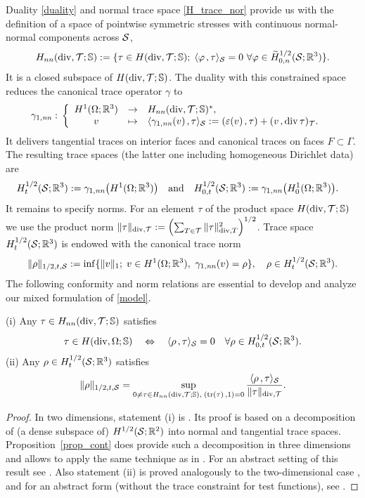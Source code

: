 \documentclass[11pt]{article}
\begin{document}
Duality \eqref{duality} and normal trace space \eqref{H_trace_nor} provide us
with the definition of a space of pointwise symmetric stresses with continuous normal-normal
components across $\mathcal{S}$,
\[
   H_{nn}(\operatorname{div},\mathcal{T};\mathbb{S}) :=
   \{\tau\in H(\operatorname{div},\mathcal{T};\mathbb{S});\;
     \langle{}\varphi\hspace*{.5mm},\tau\rangle_{\mathcal{S}}=0\ \forall \varphi\in \widetilde H^{1/2}_{0,n}(\mathcal{S};\mathbb{R}^3)\}.
\]
It is a closed subspace of $H(\operatorname{div},\mathcal{T};\mathbb{S})$.
The duality with this constrained space reduces the canonical trace operator $\gamma$ to
\begin{align*}
   {\gamma_{1,\mathit{nn}}}:\;&\left\{\begin{array}{cll}
               H^1(\Omega;\mathbb{R}^3) &\rightarrow& H_{nn}(\operatorname{div},\mathcal{T};\mathbb{S})^*,\\
               v &\mapsto& \langle{}{\gamma_{1,\mathit{nn}}}(v)\hspace*{.5mm},\tau\rangle_{\mathcal{S}}
               := (\varepsilon(v)\hspace*{.5mm},\tau) + (v\hspace*{.5mm},\operatorname{div}\tau)_{\mathcal{T}}.
            \end{array}\right.
\end{align*}
It delivers tangential traces on interior faces and canonical traces on faces $F\subset\Gamma$.
The resulting trace spaces (the latter one including homogeneous Dirichlet data) are
\begin{align*}
   H^{1/2}_t(\mathcal{S};\mathbb{R}^3) &:= {\gamma_{1,\mathit{nn}}}\bigl(H^1(\Omega;\mathbb{R}^3)\bigr)\quad\text{and}\quad
   H^{1/2}_{0,t}(\mathcal{S};\mathbb{R}^3) := {\gamma_{1,\mathit{nn}}}\bigl(H^1_0(\Omega;\mathbb{R}^3)\bigr).
\end{align*}
It remains to specify norms.
For an element $\tau$ of the product space $H(\operatorname{div},\mathcal{T};\mathbb{S})$ we use the product norm
$\|\tau\|_{\operatorname{div},\mathcal{T}}:=\Bigl(\sum_{T\in\mathcal{T}}\|\tau\|_{\operatorname{div},T}^2\Bigr)^{1/2}$.
Trace space $H^{1/2}_{t}(\mathcal{S};\mathbb{R}^3)$ is endowed with the canonical trace norm
\[
   \|\rho\|_{1/2,t,\mathcal{S}} :=
   \mathrm{inf}
   \{\|v\|_1;\; v\in H^1(\Omega;\mathbb{R}^3),\ {\gamma_{1,\mathit{nn}}}(v)=\rho\},
   \quad\rho\in H^{1/2}_{t}(\mathcal{S};\mathbb{R}^3).
\]
The following conformity and norm relations are essential to develop and analyze
our mixed formulation of \eqref{model}.

\begin{prop}[duality] \label{prop_conf}
(i) Any $\tau\in H_{nn}(\operatorname{div},\mathcal{T};\mathbb{S})$ satisfies
\[
   \tau\in H(\operatorname{div},\Omega;\mathbb{S})
   \quad\Leftrightarrow\quad
   \langle{}\rho\hspace*{.5mm},\tau\rangle_{\mathcal{S}} = 0\quad
   \forall \rho\in H^{1/2}_{0,t}(\mathcal{S};\mathbb{R}^3).
\]
(ii) Any $\rho\in H^{1/2}_{t}(\mathcal{S};\mathbb{R}^3)$ satisfies
\[
   \|\rho\|_{1/2,t,\mathcal{S}} =
   \sup_{0\not=\tau\in H_{nn}(\operatorname{div},\mathcal{T};\mathbb{S}),\; (\operatorname{tr}(\tau)\hspace*{.5mm},1)=0}
   \frac {\langle{}\rho\hspace*{.5mm},\tau\rangle_{\mathcal{S}}}{\|\tau\|_{\operatorname{div},\mathcal{T}}}.
\]
\end{prop}

\begin{proof}
In two dimensions, statement (i) is \cite[Lemma~5]{CarstensenH_NNC}.
Its proof is based on a decomposition of (a dense subspace of)
$H^{1/2}(\mathcal{S};\mathbb{R}^2)$ into normal and tangential trace spaces. Proposition~\ref{prop_cont}
does provide such a decomposition in three dimensions and allows to apply the same
technique as in \cite{CarstensenH_NNC}.
For an abstract setting of this result see \cite[Lemma~27]{Heuer_GMP}.
Also statement (ii) is proved analogously to the two-dimensional
case \cite[Proposition~6]{CarstensenH_NNC}, and for an abstract form
(without the trace constraint for test functions), see \cite[Lemma~26]{Heuer_GMP}.
\end{proof}
\end{document}
